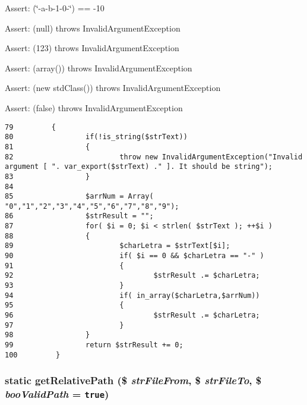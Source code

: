 \begin{Desc}
\item[Assert:](\char`\"{}-a-b-1-0-\char`\"{}) == -10\end{Desc}
\begin{Desc}
\item[Assert:](null) throws InvalidArgumentException \end{Desc}
\begin{Desc}
\item[Assert:](123) throws InvalidArgumentException \end{Desc}
\begin{Desc}
\item[Assert:](array()) throws InvalidArgumentException \end{Desc}
\begin{Desc}
\item[Assert:](new stdClass()) throws InvalidArgumentException \end{Desc}
\begin{Desc}
\item[Assert:](false) throws InvalidArgumentException \end{Desc}


\begin{Code}\begin{verbatim}79         {
80                 if(!is_string($strText))
81                 {
82                         throw new InvalidArgumentException("Invalid argument [ ". var_export($strText) ." ]. It should be string");
83                 }
84 
85                 $arrNum = Array( "0","1","2","3","4","5","6","7","8","9");
86                 $strResult = "";
87                 for( $i = 0; $i < strlen( $strText ); ++$i )
88                 {
89                         $charLetra = $strText[$i];
90                         if( $i == 0 && $charLetra == "-" )
91                         {
92                                 $strResult .= $charLetra;
93                         }
94                         if( in_array($charLetra,$arrNum))
95                         {
96                                 $strResult .= $charLetra;
97                         }
98                 }
99                 return $strResult += 0;
100         }
\end{verbatim}
\end{Code}


\hypertarget{class_coruja_string_manipulation_d93d1005c4ce820356bd2f4c0d15f6a3}{
\subsubsection[{getRelativePath}]{\setlength{\rightskip}{0pt plus 5cm}static getRelativePath (\$ {\em strFileFrom}, \/  \$ {\em strFileTo}, \/  \$ {\em booValidPath} = {\tt true})}}
\label{class_coruja_string_manipulation_d93d1005c4ce820356bd2f4c0d15f6a3}


